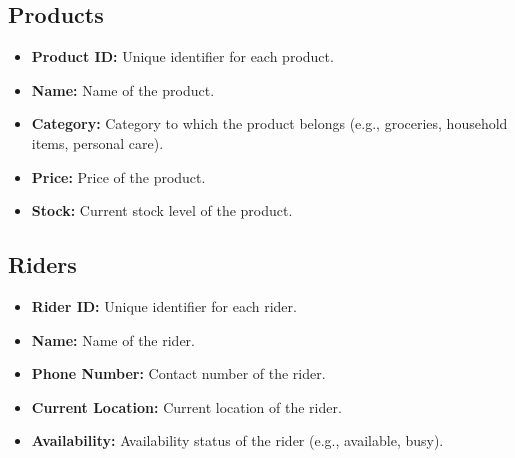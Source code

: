 \documentclass{article}
\begin{document}
\subsection{Products}
\begin{itemize}
    \item \textbf{Product ID:} Unique identifier for each product.
    \item \textbf{Name:} Name of the product.
    \item \textbf{Category:} Category to which the product belongs (e.g., groceries, household items, personal care).
    \item \textbf{Price:} Price of the product.
    \item \textbf{Stock:} Current stock level of the product.
\end{itemize}

\subsection{Riders}
\begin{itemize}
    \item \textbf{Rider ID:} Unique identifier for each rider.
    \item \textbf{Name:} Name of the rider.
    \item \textbf{Phone Number:} Contact number of the rider.
    \item \textbf{Current Location:} Current location of the rider.
    \item \textbf{Availability:} Availability status of the rider (e.g., available, busy).
\end{itemize}
\end{document}
